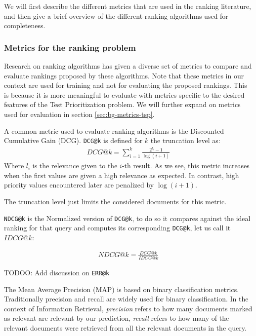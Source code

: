 We will first describe the different metrics that are used in the ranking literature, and then
give a brief overview of the different ranking algorithms used for completeness.

\subsubsection{Metrics for the ranking problem}\label{s:bg-rnk-metrics}
Research on ranking algorithms has given a diverse set of metrics to compare and evaluate
rankings proposed by these algorithms. Note that these metrics in our context are used for
training and not for evaluating the proposed rankings. This is because it is more meaningful
to evaluate with metrics specific to the desired features of the Test Prioritization problem.
We will further expand on metrics used for evaluation in section \ref{sec:bg-metrics-tsp}.

A common metric used to evaluate ranking algorithms is the Discounted Cumulative Gain (DCG).
\texttt{DCG@k} is defined for $k$ the truncation level as:
\begin{align*}
DCG@k = \sum_{i=1}^{k}\frac{2^{l_i}-1}{\log(i+1)}
\end{align*}
Where $l_i$ is the relevance given to the $i$-th result. As we see, this metric increases
when the first values are given a high relevance as expected. In contrast, high priority
values encountered later are penalized by $\log(i+1)$.

The truncation level just limits the considered documents for this metric.

\texttt{NDCG@k} is the Normalized version of \texttt{DCG@k}, to do so it compares against
the ideal ranking for that query and computes its corresponding \texttt{DCG@k}, let us
call it $IDCG@k$:

\begin{align*}
NDCG@k = \frac{DCG@k}{IDCG@k}
\end{align*}

TODOO: Add discussion on \texttt{ERR@k} 

The Mean Average Precision (MAP) is based on binary classification metrics. Traditionally
precision and recall are widely used for binary classification. In the context of
Information Retrieval, \emph{precision} refers to how many documents marked as relevant
are relevant by our prediction, \emph{recall} refers to how many of the relevant documents
were retrieved from all the relevant documents in the query. 

